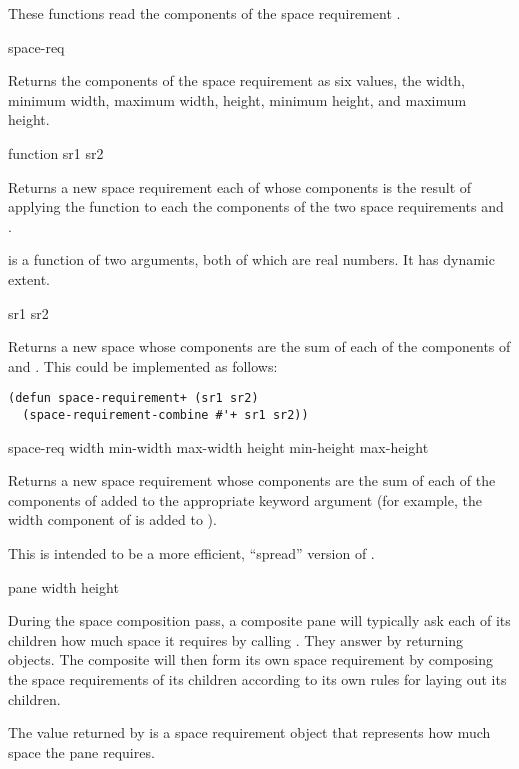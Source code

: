 These functions read the components of the space requirement .

 {space-req}

Returns the components of the space requirement  as six values,
the width, minimum width, maximum width, height, minimum height, and maximum
height.

 {function sr1 sr2}

Returns a new space requirement each of whose components is the result of
applying the function  to each the components of the two space
requirements  and .

 is a function of two arguments, both of which are real numbers.
It has dynamic extent.

 {sr1 sr2}

Returns a new space whose components are the sum of each of the components of
 and .  This could be implemented as follows:

\begin{verbatim}
(defun space-requirement+ (sr1 sr2)
  (space-requirement-combine #'+ sr1 sr2))
\end{verbatim}

 {space-req \key width min-width max-width
                                             height min-height max-height}

Returns a new space requirement whose components are the sum of each of the
components of  added to the appropriate keyword argument (for
example, the width component of  is added to ).

This is intended to be a more efficient, ``spread'' version of
.


 {pane \key width height}

During the space composition pass, a composite pane will typically ask each of
its children how much space it requires by calling .  They
answer by returning  objects.  The composite will then
form its own space requirement by composing the space requirements of its
children according to its own rules for laying out its children.

The value returned by  is a space requirement object that
represents how much space the pane  requires.

